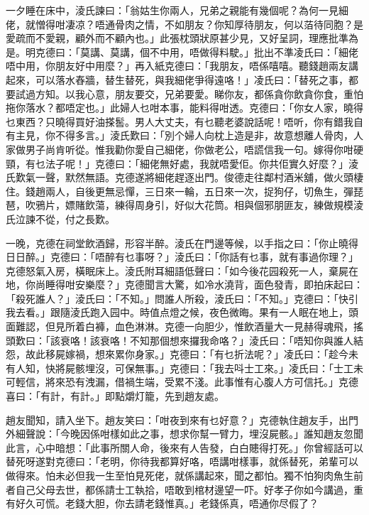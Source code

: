 \documentclass[a5paper, 12pt, openany]{book} %
\begin{document}
	一夕睡在床中，淩氏諫曰：「翁姑生你兩人，兄弟之親能有幾個呢？為何一見細佬，就憎得咁凄凉？唔通骨肉之情，不如朋友？你知厚待朋友，何以萡待同胞？是愛疏而不愛親，顧外而不顧內也。」此張枕頭狀原甚少見，又好呈詞，理應批準為是。明克德曰：「莫講、莫講，個不中用，唔做得料駛。」批出不準凌氏曰：「細佬唔中用，你朋友好中用麼？」再入紙克德曰：「我朋友，唔係嘻嘻。聽錢趙兩友講起來，可以落水舂牆，替生替死，與我細佬爭得遠咯！」凌氏曰：「替死之事，都要試過方知。以我心意，朋友要交，兄弟要愛。睇你友，都係貪你飲貪你食，重怕拖你落水？都唔定也。」此婦人乜咁本事，能料得咁透。克德曰：「你女人家，曉得乜東西？只曉得買好油搽䯻。男人大丈夫，有乜聽老婆說話呢！唔听，你有錯我自有主見，你不得多言。」淩氏歎曰：「別个婦人向枕上造是非，故意想離人骨肉，人家做男子尚肯听從。惟我勸你愛自己細佬，你做老公，唔謊信我一句。嫁得你咁硬頸，有乜法子呢！」克德曰：「細佬無好處，我就唔愛佢。你共佢實久好麼？」淩氏歎氣一聲，默然無語。克德遂將細佬趕逐出門。俊德走往鄰村酒米舖，做火頭棲住。錢趙兩人，自後更無忌憚，三日來一輪，五日來一次，捉狗仔，切魚生，彈琵琶，吹鴉片，嫖賭飲蕩，練得周身引，好似大花筒。相與個邪朋匪友，練做規模淩氏泣諫不從，付之長歎。

	一晚，克德在祠堂飲酒歸，形容半醉。淩氏在門邊等候，以手指之曰：「你止曉得日日醉。」克德曰：「唔醉有乜事呀？」淩氏曰：「你話有乜事，就有事過你理？」克德怒氣入房，橫眠床上。淩氏附耳細語低聲曰：「如今後花园殺死一人，棄屍在地，你尚睡得咁安樂麼？」克德聞言大驚，如冷水澆背，面色發青，即拍床起曰：「殺死誰人？」淩氏曰：「不知。」問誰人所殺，淩氏曰：「不知。」克德曰：「快引我去看。」跟隨淩氏跑入园中。時值点燈之候，夜色微晦。果有一人眠在地上，頭面難認，但見所着白褲，血色淋淋。克德一向胆少，惟飲酒量大一見赫得魂飛，搖頭歎曰：「該衰咯！該衰咯！不知那個想來攞我命咯？」淩氏曰：「唔知你與誰人結怨，故此移屍嫁禍，想來累你身家。」克德曰：「有乜折法呢？」凌氏曰：「趁今未有人知，快將屍骸埋沒，可保無事。」克德曰：「我去呌士工來。」凌氏曰：「士工未可輕信，將來恐有洩漏，借禍生端，受累不淺。此事惟有心腹人方可信托。」克德喜曰：「有計，有計。」即點爝灯籠，先到趙友處。

	趙友聞知，請入坐下。趙友笑曰：「咁夜到來有乜好意？」克德執住趙友手，出門外細聲說：「今晚因係咁樣如此之事，想求你幫一臂力，埋沒屍骸。」誰知趙友忽聞此言，心中暗想：「此事所關人命，後來有人告發，白白贃得打死。」你曾經話可以替死呀遂對克德曰：「老明，你待我都算好咯，唔講咁樣事，就係替死，弟輩可以做得來。怕未必但我一生至怕見死佬，就係講起來，聞之都怕。獨不怕狗肉魚生前者自己父母去世，都係請士工執拾，唔敢到棺材邊望一吓。好孝子你如今講過，重有好久可慌。老錢大胆，你去請老錢惟真。」老錢係真，唔通你尽假了？
\end{document}
